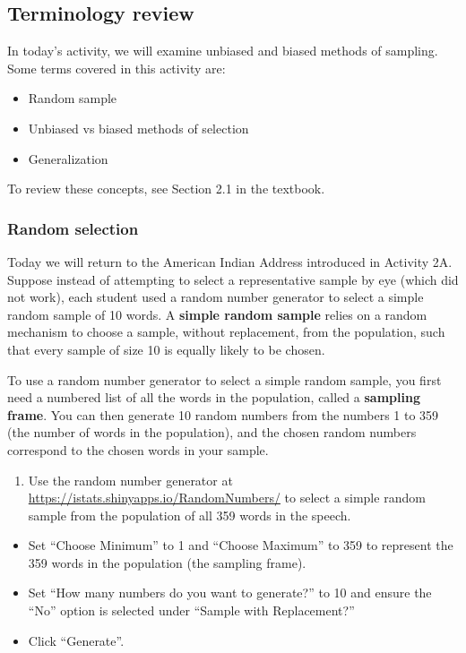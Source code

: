 \documentclass[
]{report}
\providecommand{\tightlist}{%
  \setlength{\itemsep}{0pt}\setlength{\parskip}{0pt}}
\begin{document}
\hypertarget{terminology-review-2}{%
\subsection{Terminology review}\label{terminology-review-2}}

In today's activity, we will examine unbiased and biased methods of sampling. Some terms covered in this activity are:

\begin{itemize}
\item
  Random sample
\item
  Unbiased vs biased methods of selection
\item
  Generalization
\end{itemize}

To review these concepts, see Section 2.1 in the textbook.

\hypertarget{random-selection}{%
\subsubsection*{Random selection}\label{random-selection}}

Today we will return to the American Indian Address introduced in Activity 2A. Suppose instead of attempting to select a representative sample by eye (which did not work), each student used a random number generator to select a simple random sample of 10 words. A \textbf{simple random sample} relies on a random mechanism to choose a sample, without replacement, from the population, such that every sample of size 10 is equally likely to be chosen.

To use a random number generator to select a simple random sample, you first need a numbered list of all the words in the population, called a \textbf{sampling frame}. You can then generate 10 random numbers from the numbers 1 to 359 (the number of words in the population), and the chosen random numbers correspond to the chosen words in your sample.

\begin{enumerate}
\def\labelenumi{\arabic{enumi}.}
\tightlist
\item
  Use the random number generator at \url{https://istats.shinyapps.io/RandomNumbers/} to select a simple random sample from the population of all 359 words in the speech.
\end{enumerate}

\begin{itemize}
\item
  Set ``Choose Minimum'' to 1 and ``Choose Maximum'' to 359 to represent the 359 words in the population (the sampling frame).
\item
  Set ``How many numbers do you want to generate?'' to 10 and ensure the ``No'' option is selected under ``Sample with Replacement?''
\item
  Click ``Generate''.
\end{itemize}
\end{document}
